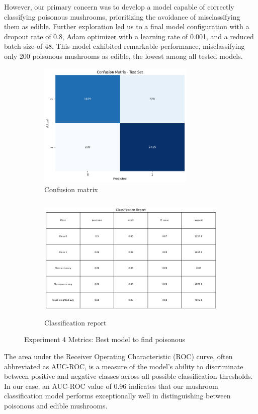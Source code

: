 However, our primary concern was to develop a model capable of correctly classifying poisonous mushrooms, prioritizing the avoidance of misclassifying them as edible. Further exploration led us to a final model configuration with a dropout rate of 0.8, Adam optimizer with a learning rate of 0.001, and a reduced batch size of 48. This model exhibited remarkable performance, misclassifying only 200 poisonous mushrooms as edible, the lowest among all tested models.
\begin{figure}[!ht]
    \centering
    \begin{subfigure}{0.45\textwidth} %
        \centering
        \includegraphics[height=6cm, width=\linewidth]{images/4.cm.png}
        \caption{Confusion matrix} %
    \end{subfigure}
    \hfill
    \begin{subfigure}{0.45\textwidth} %
        \centering
        \includegraphics[height=6cm, width=\linewidth]{images/4.cr.png}
        \caption{Classification report} %
    \end{subfigure}
    \caption{Experiment 4 Metrics: Best model to find poisonous} %
\end{figure}


The area under the Receiver Operating Characteristic (ROC) curve, often abbreviated as AUC-ROC, is a measure of the model's ability to discriminate between positive and negative classes across all possible classification thresholds. In our case, an AUC-ROC value of 0.96 indicates that our mushroom classification model performs exceptionally well in distinguishing between poisonous and edible mushrooms.

